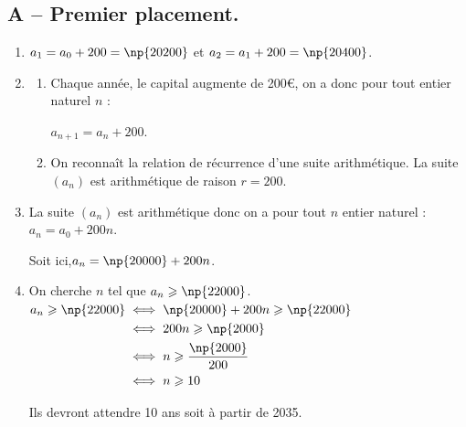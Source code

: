 \subsection*{A -- Premier placement.}
	\begin{enumerate}
		\item $a_{1} = a_0+200 = \np{20200}$ \quad et \quad $a_{2} = a_1 +200 = \np{20400}$.

		\item \begin{enumerate}
			\item Chaque année, le capital augmente de 200\euro{}, on a donc pour tout entier naturel $n$ :

			$a_{n+1}=a_n+200$.

			\item On reconnaît la relation de récurrence d'une suite arithmétique. La suite $(a_n)$ est arithmétique de raison $r=200$.
		\end{enumerate}

		\item La suite $(a_n)$ est arithmétique donc on a pour tout $n$ entier naturel :\quad $a_n=a_0+200n$.

		Soit ici,\quad $a_n=\np{20000} +200n$.

		\item On cherche $n$ tel que $a_n \geqslant  \np{22000}$.\hspace*{2cm}
		$\begin{aligned}[t] a_n \geqslant  \np{22000} & \iff \np{20000} +200n \geqslant  \np{22000}\\
		 & \iff 200n \geqslant  \np{2000}\\
		 & \iff n \geqslant \dfrac{\np{2000}}{200} \vspace*{2mm}\\
		 & \iff n \geqslant  10
		\end{aligned}$

		Ils devront attendre 10 ans soit à partir de 2035.
	\end{enumerate}

